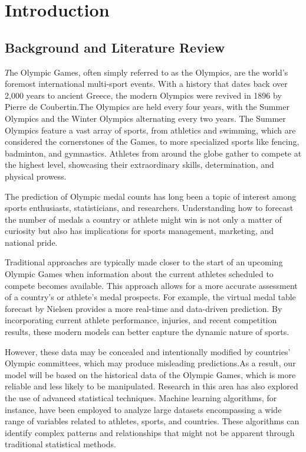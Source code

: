 \section{Introduction}

\subsection*{Background and Literature Review}

$T$he Olympic Games, often simply referred to as the Olympics, are the world's foremost international multi-sport events. With a history that dates back over 2,000 years to ancient Greece, the modern Olympics were revived in 1896 by Pierre de Coubertin.The Olympics are held every four years, with the Summer Olympics and the Winter Olympics alternating every two years. The Summer Olympics feature a vast array of sports, from athletics and swimming, which are considered the cornerstones of the Games, to more specialized sports like fencing, badminton, and gymnastics. Athletes from around the globe gather to compete at the highest level, showcasing their extraordinary skills, determination, and physical prowess.

The prediction of Olympic medal counts has long been a topic of interest among sports enthusiasts, statisticians, and researchers. Understanding how to forecast the number of medals a country or athlete might win is not only a matter of curiosity but also has implications for sports management, marketing, and national pride. 

Traditional approaches are typically made closer to the start of an upcoming Olympic Games when information about the current athletes scheduled to compete becomes available. This approach allows for a more accurate assessment of a country's or athlete's medal prospects. For example, the virtual medal table forecast by Nielsen \cite{1} provides a more real-time and data-driven prediction. By incorporating current athlete performance, injuries, and recent competition results, these modern models can better capture the dynamic nature of sports.

However, these data may be concealed and intentionally modified by countries' Olympic committees, which may produce misleading predictions.As a result, our model will be based on the historical data of the Olympic Games, which is more reliable and less likely to be manipulated.
Research in this area has also explored the use of advanced statistical techniques. Machine learning algorithms, for instance, have been employed to analyze large datasets encompassing a wide range of variables related to athletes, sports, and countries. These algorithms can identify complex patterns and relationships that might not be apparent through traditional statistical methods.

